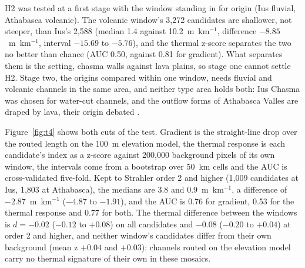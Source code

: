 \documentclass[twocolumn]{aastex701}
\begin{document}
H2 was tested at a first stage with the window standing in for origin (Ius fluvial, Athabasca volcanic). The volcanic
window's 3,272 candidates are shallower, not steeper, than Ius's 2,588 (median 1.4 against 10.2~m~km$^{-1}$, difference
$-8.85$~m~km$^{-1}$, interval $-15.69$ to $-5.76$), and the thermal z-score separates the two no better than chance (AUC
0.50, against 0.81 for gradient). What separates them is the setting, chasma walls against lava plains, so stage one
cannot settle H2. Stage two, the origins compared within one window, needs fluvial and volcanic channels in the same
area, and neither type area holds both: Ius Chasma was chosen for water-cut channels, and the outflow forms of
Athabasca Valles are draped by lava, their origin debated \citep{Burr2002, Jaeger2007}. %

Figure~\ref{fig:t4} shows both cuts of the test. Gradient is the straight-line drop over the routed length on the
100~m elevation model, the thermal response is each candidate's index as a z-score against 200,000 background pixels
of its own window, the intervals come from a bootstrap over 50~km cells and the AUC is cross-validated five-fold. Kept
to Strahler order 2 and higher (1,009 candidates at Ius, 1,803 at Athabasca), the medians are 3.8 and
0.9~m~km$^{-1}$, a difference of $-2.87$~m~km$^{-1}$ ($-4.87$ to $-1.91$), and the AUC is 0.76 for gradient, 0.53 for
the thermal response and 0.77 for both. The thermal difference between the windows is $d=-0.02$ ($-0.12$ to $+0.08$)
on all candidates and $-0.08$ ($-0.20$ to $+0.04$) at order 2 and higher, and neither window's candidates differ from
their own background (mean z $+0.04$ and $+0.03$): channels routed on the elevation model carry no thermal signature
of their own in these mosaics. %
\end{document}
